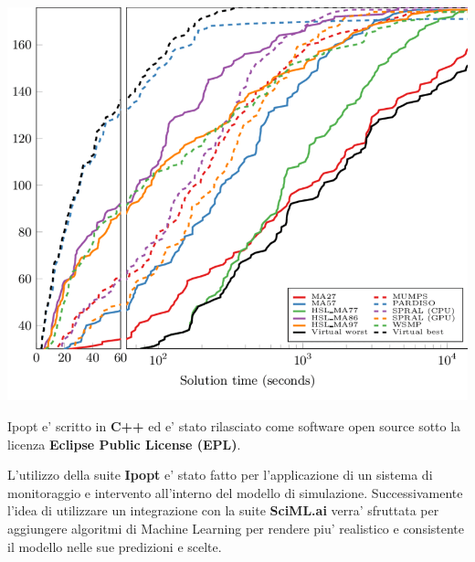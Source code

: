 \begin{minipage}{\linewidth}
    \centering
    \includegraphics[width=\textwidth]{img/Comparison-of-Ipopt-performance-over-various-linear-solvers-using-the-two-dimensional.png}
    \label{fig:Ipopt_solver}
\end{minipage}

Ipopt e' scritto in \textbf{C++} ed e' stato rilasciato come software open source sotto la licenza \textbf{Eclipse Public License (EPL)}.

L'utilizzo della suite \textbf{Ipopt} e' stato fatto per l'applicazione di un sistema
di monitoraggio e intervento all'interno del modello di simulazione. Successivamente l'idea
di utilizzare un integrazione con la suite \textbf{SciML.ai} verra' sfruttata per 
aggiungere algoritmi di Machine Learning per rendere piu' realistico e consistente il modello 
nelle sue predizioni e scelte.

